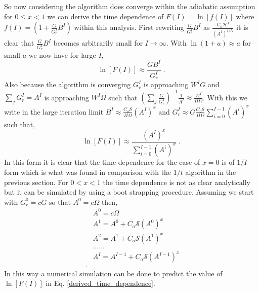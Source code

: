 \documentclass[a4paper,12pt]{article}
\begin{document}
   So now considering the algorithm does converge within the adiabatic assumption for $0\le x < 1 $ we can derive the time dependence of $F(I)=\ln[f(I)]$ where $f(I) = (1 + \frac{G}{G_r^I}B^I)$ within this analysis. First rewriting $\frac{G}{G_r^I}B^I$ as $\frac{C_o\mathcal{H}^I}{(A^I)^{1/N}}$ it is clear that $\frac{G}{G_r^I}B^I$ becomes arbitrarily small for $I \rightarrow \infty$. With  $\ln(1+a) \approx a$ for small $a$ we now have for large $I$, 
\begin{equation}
\ln[F(I)] \approx  \frac{GB^I}{G_r^I} \;.
\end{equation}
Also because the algorithm is converging $G_r^I$ is approaching $W^IG$ and $\sum_j G_r^I = A^I$ is approaching $W^I\Omega$ such that $(\sum_{j}\frac{G}{G_r^{I}})^{-1} \frac{1}{A^I}\approx \frac{W^I}{\Pi\Omega}$. With this we write  in the large iteration limit $B^I \approx  \frac{C_o\mathcal{S}}{\Pi\Omega}(A^I)^x$ and $G_r^I \approx G \frac{C_o\mathcal{S}}{\Pi\Omega}\sum_{i=0}^{I-1}(A^i)^x$ such that, 
\begin{equation}
\ln[F(I)] \approx \frac{(A^I)^x}{\sum_{i=0}^{I-1}(A^i)^x} \;.
\label{derived_time_dependence}
\end{equation}
In this form it is clear that the time dependence for the case of $x=0$ is of $1/I$ form which is what was found in comparison with the $1/t$ algorithm in the previous section. For  $ 0 < x < 1$ the time dependence is not as clear analytically but it can be simulated by using a boot strapping procedure. Assuming we start with $G_r^0=cG$ so that $A^0=c\Omega$ then, 
\begin{equation}
\begin{split}
&A^0=c\Omega\\
&A^1 = A^0     +  C_o\mathcal{S}(A^0)^x\\
&A^2 = A^1     +  C_o\mathcal{S}(A^1)^x\\
&......\\
&A^I = A^{I-1} +  C_o\mathcal{S}(A^{I-1})^x\\\;.
\end{split}
\end{equation} 
In this way a numerical simulation can be done to predict the value of $\ln[F(I)]$ in Eq. \ref{derived_time_dependence}.
\end{document}
